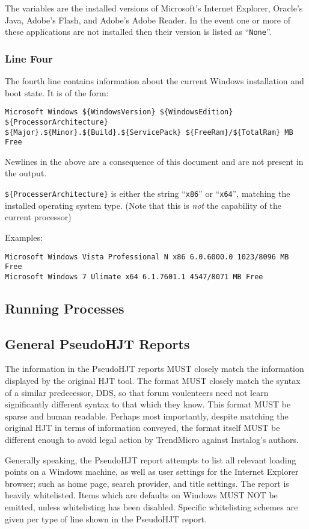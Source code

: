 \documentclass[letterpaper,12pt]{article}
\newcommand{\var}[1]{\texttt{\$\{#1\}}}
\begin{document}
The variables are the installed versions of Microsoft's Internet Explorer,
Oracle's Java, Adobe's Flash, and Adobe's Adobe Reader. In the event one or more
of these applications are not installed then their version is listed as
``\verb|None|''.

\subsubsection{Line Four}
The fourth line contains information about the current Windows installation and
boot state. It is of the form:
\begin{verbatim}
Microsoft Windows ${WindowsVersion} ${WindowsEdition} ${ProcessorArchitecture}
${Major}.${Minor}.${Build}.${ServicePack} ${FreeRam}/${TotalRam} MB Free
\end{verbatim}

Newlines in the above are a consequence of this document and are not present in
the output.

\var{ProcesserArchitecture} is either the string ``\verb|x86|'' or
``\verb|x64|'', matching the installed operating system type. (Note that this is
\textit{not} the capability of the current processor)

Examples:
\begin{verbatim}
Microsoft Windows Vista Professional N x86 6.0.6000.0 1023/8096 MB Free
Microsoft Windows 7 Ulimate x64 6.1.7601.1 4547/8071 MB Free
\end{verbatim}

\subsection{Running Processes}

\subsection{General PseudoHJT Reports}
The information in the PseudoHJT reports MUST closely match the information
displayed by the original HJT tool. The format MUST closely match the syntax of
a similar predecessor, DDS, so that forum voulenteers need not learn
significantly different syntax to that which they know. This format MUST be
sparse and human readable. Perhaps most importantly, despite matching the
original HJT in terms of information conveyed, the format itself MUST be
different enough to avoid legal action by TrendMicro against Instalog's authors.

Generally speaking, the PseudoHJT report attempts to list all relevant loading
points on a Windows machine, as well as user settings for the Internet Explorer
browser; such as home page, search provider, and title settings. The report is
heavily whitelisted. Items which are defaults on Windows MUST NOT be emitted,
unless whitelisting has been disabled. Specific whitelisting schemes are given
per type of line shown in the PseudoHJT report.
\end{document}
